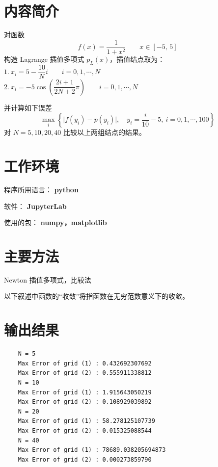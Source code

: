 \documentclass{ctexart}
\begin{document}
\section*{内容简介}
	\noindent 对函数 
	\begin{equation}
		f(x) = \dfrac{1}{1 + x^2}\qquad x\in[−5,\,5]
	\end{equation}
	构造 Lagrange 插值多项式 $p_L(x)$，插值结点取为：\\
	
	$1.\ x_i = 5 − \dfrac{10}{N} i \qquad i = 0, 1, \cdots, N$\\
	
	$2.\ x_i = −5\cos\left(\dfrac{2i + 1}{2N + 2}\pi\right) \qquad i = 0, 1, \cdots, N$
	
	\noindent 并计算如下误差
	\begin{equation}
		\max\limits_i\left\{\Big|f(y_i) − p(y_i)\Big|,\quad y_i = \dfrac{i}{10} − 5,\ i = 0, 1, \cdots, 100\right\}
	\end{equation}
	对 $N = 5, 10, 20, 40$ 比较以上两组结点的结果。
	
\section*{工作环境}
	程序所用语言： {\bf python}
	
	软件： {\bf JupyterLab}
	
	使用的包： {\bf numpy，matplotlib}
	
\section*{主要方法}
	Newton 插值多项式，比较法
	
	以下叙述中函数的“收敛”将指函数在无穷范数意义下的收敛。

\section*{输出结果}

\begin{verbatim}
	N = 5
	Max Error of grid (1) : 0.432692307692
	Max Error of grid (2) : 0.555911338812
	N = 10
	Max Error of grid (1) : 1.915643050219
	Max Error of grid (2) : 0.108929039892
	N = 20
	Max Error of grid (1) : 58.278125107739
	Max Error of grid (2) : 0.015325088544
	N = 40
	Max Error of grid (1) : 78689.038205694873
	Max Error of grid (2) : 0.000273859790
\end{verbatim}
\end{document}
